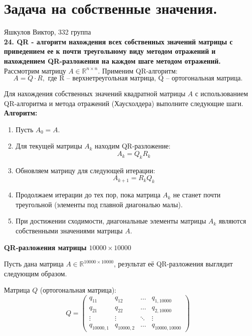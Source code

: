 \documentclass[14pt]{report}
\begin{document}

\section*{Задача на собственные значения.}
\hfill Яшкулов Виктор, 332 группа\\

\textbf{24. QR - алгоритм нахождения всех собственных значений матрицы с приведением ее к почти треугольному виду методом отражений и нахождением QR-разложения на каждом шаге методом
отражений.} \\ 

Рассмотрим матрицу $A \in \mathbb{R}^{n \times n}$. Применим QR-алгоритм:
\[ A = Q \cdot R, \text{ где R -- верхнетреугольная матрица, Q -- ортогональная матрица.} \]

Для нахождения собственных значений квадратной матрицы $A$ с использованием QR-алгоритма и метода отражений (Хаусхолдера) выполните следующие шаги.\\

\textbf{Алгоритм:}
\begin{enumerate}
    \item Пусть $A_0 = A$.
    \item Для текущей матрицы $A_k$ находим QR-разложение:
    \[
    A_k = Q_k R_k
    \]
    \item Обновляем матрицу для следующей итерации:
    \[
    A_{k+1} = R_k Q_k
    \]
    \item Продолжаем итерации до тех пор, пока матрица $A_k$ не станет почти треугольной (элементы под главной диагональю малы).
    \item При достижении сходимости, диагональные элементы матрицы $A_k$ являются собственными значениями матрицы $A$.\\
\end{enumerate}

\textbf{QR-разложения матрицы \( 10000 \times 10000 \)}

Пусть дана матрица \( A \in \mathbb{R}^{10000 \times 10000} \), результат её QR-разложения выглядит следующим образом.

Матрица \( Q \) (ортогональная матрица):
\[
Q = \begin{pmatrix}
q_{11} & q_{12} & \dots & q_{1,10000} \\
q_{21} & q_{22} & \dots & q_{2,10000} \\
\vdots & \vdots & \ddots & \vdots \\
q_{10000,1} & q_{10000,2} & \dots & q_{10000,10000}
\end{pmatrix}
\]
\end{document}
